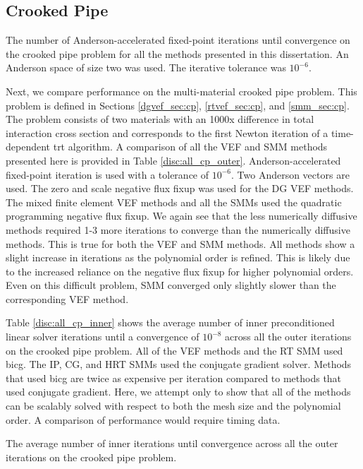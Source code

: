 \documentclass[../doc.tex]{subfiles}
\begin{document}
\subsection{Crooked Pipe}
\begin{table}
\centering
\caption{The number of Anderson-accelerated fixed-point iterations until convergence on the crooked pipe problem for all the methods presented in this dissertation. An Anderson space of size two was used. The iterative tolerance was $10^{-6}$. }
\label{disc:all_cp_outer}

\end{table}
Next, we compare performance on the multi-material crooked pipe problem. This problem is defined in Sections \ref{dgvef_sec:cp}, \ref{rtvef_sec:cp}, and \ref{smm_sec:cp}. The problem consists of two materials with an 1000x difference in total interaction cross section and corresponds to the first Newton iteration of a time-dependent \gls{trt} algorithm. A comparison of all the VEF and SMM methods presented here is provided in Table \ref{disc:all_cp_outer}. Anderson-accelerated fixed-point iteration is used with a tolerance of $10^{-6}$. Two Anderson vectors are used. The zero and scale negative flux fixup was used for the DG VEF methods. The mixed finite element VEF methods and all the SMMs used the quadratic programming negative flux fixup. We again see that the less numerically diffusive methods required 1-3 more iterations to converge than the numerically diffusive methods. This is true for both the VEF and SMM methods. All methods show a slight increase in iterations as the polynomial order is refined. This is likely due to the increased reliance on the negative flux fixup for higher polynomial orders. 
Even on this difficult problem, SMM converged only slightly slower than the corresponding VEF method. 

Table \ref{disc:all_cp_inner} shows the average number of inner preconditioned linear solver iterations until a convergence of $10^{-8}$ across all the outer iterations on the crooked pipe problem. 
All of the VEF methods and the RT SMM used \gls{bicg}. The IP, CG, and HRT SMMs used the conjugate gradient solver. 
Methods that used \gls{bicg} are twice as expensive per iteration compared to methods that used conjugate gradient.
Here, we attempt only to show that all of the methods can be scalably solved with respect to both the mesh size and the polynomial order. A comparison of performance would require timing data. 
\begin{table}
\centering
\caption{The average number of inner iterations until convergence across all the outer iterations on the crooked pipe problem. }
\label{disc:all_cp_inner}

\end{table}
\end{document}
